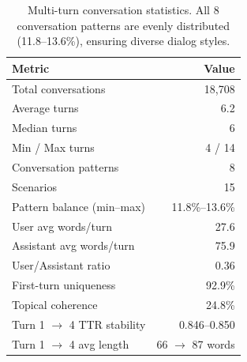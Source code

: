 \begin{table}[t]
\centering
\caption{Multi-turn conversation statistics. All 8 conversation patterns are evenly distributed (11.8--13.6\%), ensuring diverse dialog styles.}
\label{tab:multiturn}
\small
\begin{tabular}{lr}
\toprule
\textbf{Metric} & \textbf{Value} \\
\midrule
Total conversations & 18,708 \\
Average turns & 6.2 \\
Median turns & 6 \\
Min / Max turns & 4 / 14 \\
\midrule
Conversation patterns & 8 \\
Scenarios & 15 \\
Pattern balance (min--max) & 11.8\%--13.6\% \\
\midrule
User avg words/turn & 27.6 \\
Assistant avg words/turn & 75.9 \\
User/Assistant ratio & 0.36 \\
\midrule
First-turn uniqueness & 92.9\% \\
Topical coherence & 24.8\% \\
\midrule
Turn 1 $\to$ 4 TTR stability & 0.846--0.850 \\
Turn 1 $\to$ 4 avg length & 66 $\to$ 87 words \\
\bottomrule
\end{tabular}
\end{table}